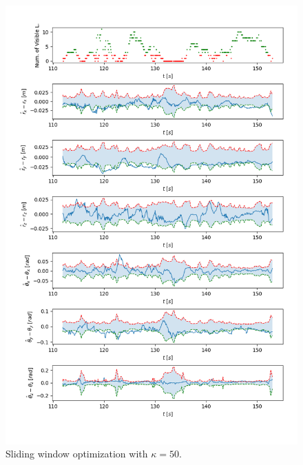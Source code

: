 \documentclass[a4paper]{article}
\begin{document}
\begin{figure}[H]
    \centering
    \includegraphics[width=\textwidth]{code/sliding_window_50.png}
    \caption{Sliding window optimization with $\kappa= 50$.}
    \label{fig:5b}
\end{figure}
\end{document}
